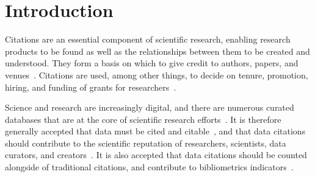 \section{Introduction}

Citations are an essential component of scientific research, enabling research products to be found as well as the relationships between them to be created and understood. 
They form a basis on which to give credit to authors, papers, and venues~\citep{ZouP16, cousijn2019bringing, cronin1984}.
Citations are used, among other things, to decide on tenure, promotion, hiring, and funding of grants for researchers~\citep{meho2007impact, Cronin01, Hartley17, Kosten16}.

Science and research are increasingly digital, and there are numerous curated databases that are at the core of scientific research efforts~\citep{bunemann2016citation}.
It is therefore generally accepted that data must be cited and citable~\citep{LawrenceEtAl2011,CallaghanDPTCKABBLLMHSWW12}, and that data citations should contribute to the scientific reputation of researchers, scientists, data curators, and creators~\citep{AltmanEtAl2015,Spengler2012}.
It is also accepted that data citations should be counted alongside of traditional citations, and contribute to bibliometrics indicators~\citep{Belter2014,Peters2016}.


